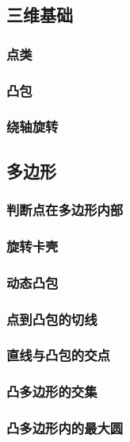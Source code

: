 \documentclass[a4paper]{article}
\begin{document}
\subsection{三维基础}

\subsubsection{点类}

\subsubsection{凸包}

\subsubsection{绕轴旋转}

\subsection{多边形}

\subsubsection{判断点在多边形内部}

\subsubsection{旋转卡壳}

\subsubsection{动态凸包}

\subsubsection{点到凸包的切线}

\subsubsection{直线与凸包的交点}

\subsubsection{凸多边形的交集}

\subsubsection{凸多边形内的最大圆}
\end{document}
